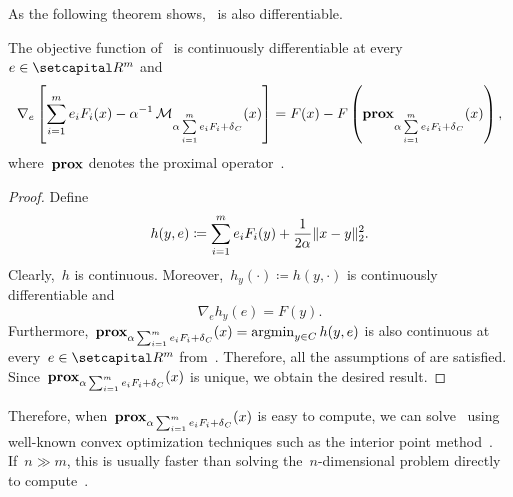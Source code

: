 \documentclass[../../main]{subfiles}
\begin{document}
As the following theorem shows,~ is also differentiable.
\begin{theorem} 
    The objective function of~ is continuously differentiable at every~$e \in \setR^m$ and
    \begin{equation}
        \nabla_e \left[ \sum_{i = 1}^{m} e_i F_i(x) - \alpha^{-1} \operatorname{\mathcal{M}}_{\alpha \sum\limits_{i = 1}^{m} e_i F_i + \operatorname{\delta}_C}(x) \right] = F(x) - F\left( \operatorname{\mathbf{prox}}_{\alpha \sum\limits_{i = 1}^{m} e_i F_i + \operatorname{\delta}_C}(x) \right)
        ,\end{equation}
    where~$\operatorname{\mathbf{prox}}$ denotes the proximal operator~.
\end{theorem}
\begin{proof}
    Define
    \begin{equation}
        h(y, e) \coloneqq \sum_{i = 1}^{m} e_i F_i(y) + \frac{1}{2 \alpha} \lVert x - y\rVert_2^2
        .\end{equation}
    Clearly,~$h$ is continuous.
    Moreover,~$h_y(\cdot) \coloneqq h(y, \cdot)$ is continuously differentiable and
    \begin{equation}
        \nabla_e h_y(e) = F(y)
        .\end{equation}
    Furthermore,~$\operatorname{\mathbf{prox}}_{\alpha \sum_{i = 1}^{m} e_i F_i + \operatorname{\delta}_C}(x) = \operatorname*{argmin}_{y \in C} h(y, e)$ is also continuous at every~$e \in \setR^m$ from~\cite[Excercise 7.38]{Rockafellar1998}.
    Therefore, all the assumptions of  are satisfied.
    Since~$\operatorname{\mathbf{prox}}_{\alpha \sum_{i = 1}^{m} e_i F_i + \operatorname{\delta}_C}(x)$ is unique, we obtain the desired result.
\end{proof}
Therefore, when~$\operatorname{\mathbf{prox}}_{\alpha \sum_{i = 1}^{m} e_i F_i + \operatorname{\delta}_C}(x)$ is easy to compute, we can solve~ using well-known convex optimization techniques such as the interior point method~\cite{Bertsekas1999}.
If~$n \gg m$, this is usually faster than solving the~$n$-dimensional problem directly to compute~.
\end{document}
